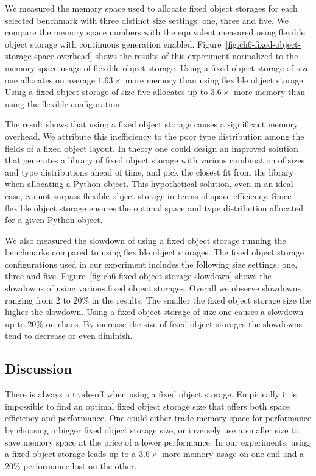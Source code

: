We measured the memory space used to allocate fixed object storages for each selected benchmark with three distinct size settings: one, three and five.
We compare the memory space numbers with the equivalent measured using flexible object storage with continuous generation enabled.
Figure~\ref{fig:ch6-fixed-object-storage-space-overhead} shows the results of this experiment normalized to the memory space usage of flexible object storage.
Using a fixed object storage of size one allocates on average $1.63\times$ more memory than using flexible object storage.
Using a fixed object storage of size five allocates up to $3.6\times$ more memory than using the flexible configuration.

The result shows that using a fixed object storage causes a significant memory overhead.
We attribute this inefficiency to the poor type distribution among the fields of a fixed object layout.
In theory one could design an improved solution that generates a library of fixed object storage with various combination of sizes and type distributions ahead of time, and pick the closest fit from the library when allocating a Python object.
This hypothetical solution, even in an ideal case, cannot surpass flexible object storage in terms of space efficiency.
Since flexible object storage ensures the optimal space and type distribution allocated for a given Python object.

We also measured the slowdown of using a fixed object storage running the benchmarks compared to using flexible object storages.
The fixed object storage configurations used in our experiment includes the following size settings: one, three and five.
Figure~\ref{fig:ch6-fixed-object-storage-slowdown} shows the slowdowns of using various fixed object storages.
Overall we observe slowdowns ranging from $2$ to $20\%$ in the results.
The smaller the fixed object storage size the higher the slowdown.
Using a fixed object storage of size one causes a slowdown up to $20\%$ on \textsf{chaos}.
By increase the size of fixed object storages the slowdowns tend to decrease or even diminish.

\subsection{Discussion}

There is always a trade-off when using a fixed object storage.
Empirically it is impossible to find an optimal fixed object storage size that offers both space efficiency and performance.
One could either trade memory space for performance by choosing a bigger fixed object storage size,
or inversely use a smaller size to save memory space at the price of a lower performance.
In our experiments, using a fixed object storage leads up to a $3.6\times$ more memory usage on one end and a $20\%$ performance lost on the other.

